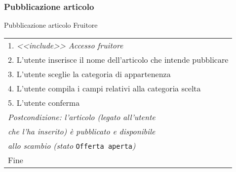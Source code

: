 \begin{minipage}{\textwidth}
    \subsubsection{Pubblicazione articolo}
    \usecase
        {Pubblicazione articolo}
        {
            Fruitore %
        }
        {
            \begin{tabular}{l}
                1. \textit{<<include>> Accesso fruitore}\\
                2. L'utente inserisce il nome dell'articolo che intende pubblicare\\
                3. L'utente sceglie la categoria di appartenenza\\
                4. L'utente compila i campi relativi alla categoria scelta\\
                5. L'utente conferma\\
                \textit{Postcondizione: l'articolo (legato all'utente}\\
                \textit{che l'ha inserito) è pubblicato e disponibile}\\
                \textit{allo scambio (stato }\texttt{Offerta aperta}\textit{)}\\
                Fine
            \end{tabular}\\

            \\

            \\


        }
        \vspace{0.5cm}
\end{minipage}
